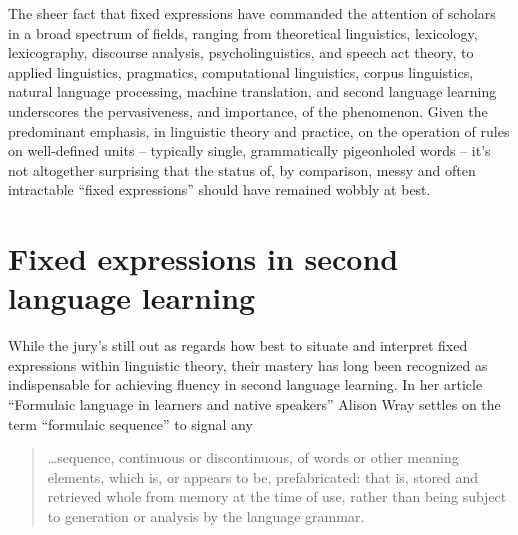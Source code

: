 \documentclass[english,output=paper,colorlinks,citecolor=brown]{../langscibook}
\begin{document}
The sheer fact that fixed expressions have commanded the attention of scholars in a broad spectrum of fields, ranging from theoretical linguistics, lexicology, lexicography, discourse analysis, psycholinguistics, and speech act theory, to applied linguistics, pragmatics, computational linguistics, corpus linguistics, natural language processing, machine translation, and second language learning underscores the pervasiveness, and importance, of the phenomenon. Given the predominant emphasis, in linguistic theory and practice, on the operation of rules on well-defined units – typically single, grammatically pigeonholed words – it’s not altogether surprising that the status of, by comparison, messy and often intractable ``fixed expressions'' should have remained wobbly at best. 

\section{Fixed expressions in second language learning}

While the jury’s still out as regards how best to situate and interpret fixed expressions within linguistic theory, their mastery has long been recognized as indispensable for achieving fluency in second language learning. In her article “Formulaic language in learners and native speakers” Alison Wray settles on the term ``formulaic sequence'' to signal any 

\begin{quote}
    …sequence, continuous or discontinuous, of words or other meaning elements, which is, or appears to be, prefabricated: that is, stored and retrieved whole from memory at the time of use, rather than being subject to generation or analysis by the language grammar. \citep[214]{Wray1999} 
\end{quote}
\end{document}
